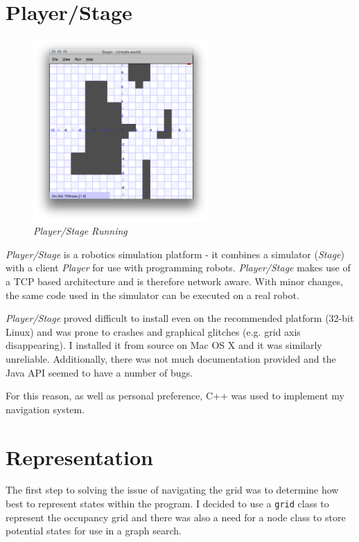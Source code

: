 \documentclass[a4paper,12pt]{article}
\begin{document}
\section{Player/Stage}
\begin{figure}
    \begin{center}
            \includegraphics[width=0.6\textwidth]{images/Start_GUI.png}
            \caption{\textit{Player/Stage Running}}
    \end{center}
\end{figure}
\textit{Player/Stage} is a robotics simulation platform - it combines a simulator (\textit{Stage}) with a client \textit{Player} for use with programming robots. \textit{Player/Stage} makes use of a TCP based architecture \cite{pstcp} and is therefore network aware. With minor changes, the same code used in the simulator can be executed on a real robot.

\textit{Player/Stage} proved difficult to install even on the recommended platform (32-bit Linux) and was prone to crashes and graphical glitches (e.g. grid axis disappearing). I installed it from source on Mac OS X and it was similarly unreliable. Additionally, there was not much documentation provided and the Java API seemed to have a number of bugs. 

For this reason, as well as personal preference, C++ was used to implement my navigation system.
\section{Representation}
The first step to solving the issue of navigating the grid was to determine how best to represent states within the program. I decided to use a \texttt{grid} class to represent the occupancy grid and there was also a need for a node class to store potential states for use in a graph search. 
\end{document}
